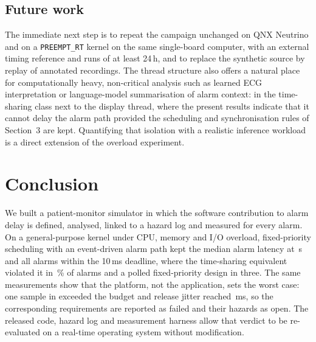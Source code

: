 \subsection{Future work}
The immediate next step is to repeat the campaign unchanged on QNX Neutrino and on a \texttt{PREEMPT\_RT} kernel on the same single-board computer, with an external timing reference and runs of at least 24\,h, and to replace the synthetic source by replay of annotated recordings. The thread structure also offers a natural place for computationally heavy, non-critical analysis such as learned ECG interpretation or language-model summarisation of alarm context: in the time-sharing class next to the display thread, where the present results indicate that it cannot delay the alarm path provided the scheduling and synchronisation rules of Section~3 are kept. Quantifying that isolation with a realistic inference workload is a direct extension of the overload experiment.

\section{Conclusion}
We built a patient-monitor simulator in which the software contribution to alarm delay is defined, analysed, linked to a hazard log and measured for every alarm. On a general-purpose kernel under CPU, memory and I/O overload, fixed-priority scheduling with an event-driven alarm path kept the median alarm latency at \NFpEvStrMed\,\textmu s and all \NFpEvStrN{} alarms within the 10\,ms deadline, where the time-sharing equivalent violated it in \NTsEvStrMissPct\,\% of alarms and a polled fixed-priority design in three. The same measurements show that the platform, not the application, sets the worst case: one sample in \NFpEvStrNSamp{} exceeded the budget and release jitter reached \NFpEvStrJitMaxMs\,ms, so the corresponding requirements are reported as failed and their hazards as open. The released code, hazard log and measurement harness allow that verdict to be re-evaluated on a real-time operating system without modification.
